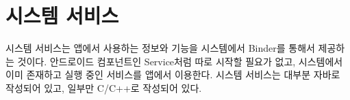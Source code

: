 \chapter{시스템 서비스}
시스템 서비스는 앱에서 사용하는 정보와 기능을 시스템에서 Binder를 통해서 제공하는 것이다.
안드로이드 컴포넌트인 Service처럼 따로 시작할 필요가 없고, 시스템에서 이미 존재하고 실행 중인 서비스를 앱에서 이용한다.
시스템 서비스는 대부분 자바로 작성되어 있고, 일부만 C/C++로 작성되어 있다.\\

